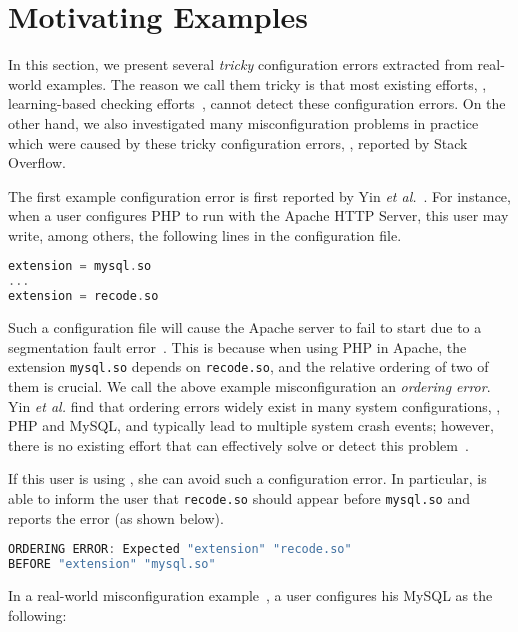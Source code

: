\section{Motivating Examples}
\label{sec-motiv}

In this section, we present several {\em tricky} configuration errors
extracted from real-world examples. 
The reason we call them tricky is that
most existing efforts, \eg, learning-based checking
efforts~\cite{zhang14encore, wang04automatic}, cannot detect
these configuration errors.
On the other hand, we also investigated 
many misconfiguration problems in practice which were caused by 
these tricky configuration errors, \eg, reported by Stack Overflow.

The first example configuration error is first reported by 
Yin {\em et al.}~\cite{yin11anempirical}.
For instance, when a user configures PHP to run with the
Apache HTTP Server, this user may write, among others, 
the following lines in the configuration file.

\begin{lstlisting}[language=C, xleftmargin=.01\textwidth]
extension = mysql.so
...
extension = recode.so
\end{lstlisting} 

Such a configuration file will cause the Apache server to 
fail to start due to a segmentation fault error~\cite{yin11anempirical}. 
This is because when using PHP in Apache, the extension {\tt mysql.so} 
depends on {\tt recode.so}, and the relative ordering of two of them 
is crucial. 
We call the above example misconfiguration 
an {\em ordering error}.
Yin {\em et al.} find that ordering errors widely exist in
many system configurations, \eg, PHP and MySQL,
and typically lead to multiple system crash events;
however, there is no existing effort that can effectively solve 
or detect this problem~\cite{zhang14encore, xu15systems, xu13do}.

If this user is using \app, she can avoid such a configuration error.
In particular, \app is able to inform the user that {\tt recode.so} 
should appear before {\tt mysql.so} and reports the error (as shown
below).

\begin{lstlisting}[language=C, xleftmargin=.01\textwidth]
ORDERING ERROR: Expected "extension" "recode.so"
BEFORE "extension" "mysql.so"
\end{lstlisting} 

In a real-world misconfiguration example~\cite{correlation}, 
a user configures his MySQL as the following:

